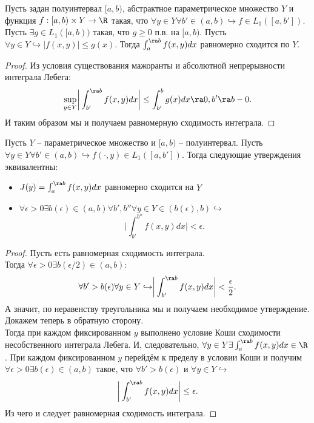 \begin{theorem} %
    Пусть задан полуинтервал $[a, b)$, абстрактное параметрическое множество $Y$ и функция $f: [a, b) \times Y \to \R$ такая, что $\forall y \in Y \forall b' \in (a, b) \hookrightarrow f \in L_1([a, b'])$.
    Пусть $\exists g \in L_1([a, b))$ такая, что $g \geq 0$ п.в. на $[a, b)$.
    Пусть $\forall y \in Y \hookrightarrow |f(x, y)| \leq g(x)$.
    Тогда $\int_a^{\ra b} f(x, y)dx$ равномерно сходится по $Y$.
\end{theorem}
\begin{proof}
    Из условия существования мажоранты и абсолютной непрерывности интеграла Лебега:
    \[
        \sup\limits_{y \in Y} \biggr| \int_{b'}^{\ra b} f(x, y)dx \biggr| \leq \int_{b'}^{b} g(x)dx \ra 0, b' \ra b - 0.
    \]
    И таким образом мы и получаем равномерную сходимость интеграла.
\end{proof}
\begin{theorem}
    Пусть $Y$ -- параметрическое множество и $[a, b)$ -- полуинтервал.
    Пусть $\forall y \in Y \forall b' \in (a, b) \hookrightarrow f(\cdot, y) \in L_1([a, b'])$.
    Тогда следующие утверждения эквивалентны:
    \begin{itemize}
        \item $J(y) = \int_a^{\ra b} f(x, y)dx$ равномерно сходится на $Y$
        \item $\forall \epsilon > 0 \exists b(\epsilon) \in (a, b) \forall b', b'' \forall y \in Y \in (b(\epsilon), b) \hookrightarrow$
        \[
            \biggr|\int_{b'}^{b''} f(x, y)dx \biggr| < \epsilon.
        \]
    \end{itemize}
\end{theorem} %
\begin{proof}
    Пусть есть равномерная сходимость интеграла. \\
    Тогда $\forall \epsilon > 0 \exists b(\epsilon/2) \in (a, b)$:
    \[
        \forall b' > b(\epsilon) \forall y \in Y \hookrightarrow \biggr|\int_{b'}^{\ra b}f(x, y)dx \biggr| < \dfrac{\epsilon}{2}.
    \]
    А значит, по неравенству треугольника мы и получаем необходимое утверждение. \\
    Докажем теперь в обратную сторону. \\
    Тогда при каждом фиксированном $y$ выполнено условие Коши сходимости несобственного интеграла Лебега.
    И, следовательно, $\forall y \in Y \exists \int_{a}^{\ra b} f(x, y)dx \in \R$ .
    При каждом фиксированном $y$ перейдём к пределу в условии Коши и получим $\forall \epsilon > 0 \exists b(\epsilon) \in (a, b)$ такое, что $\forall b' > b(\epsilon)$ и $\forall y \in Y \hookrightarrow$
    \[
        \biggr| \int_{b'}^{\ra b}f(x, y)dx \biggr| \leq \epsilon.
    \]
    Из чего и следует равномерная сходимость интеграла.
\end{proof}


